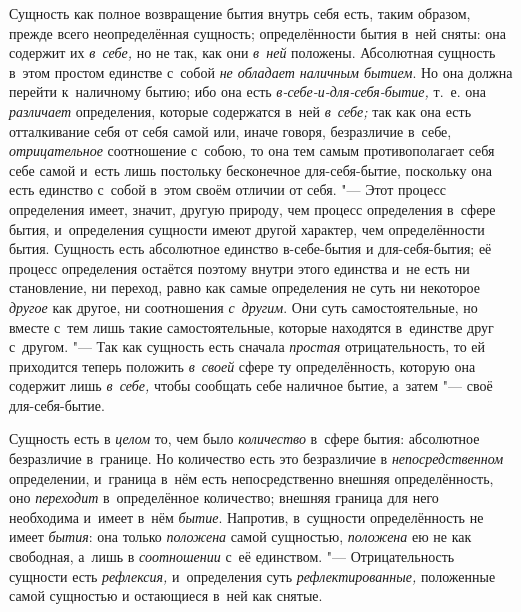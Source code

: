 Сущность как полное возвращение бытия внутрь себя есть, таким образом,
прежде всего неопределённая сущность; определённости бытия в~ней сняты: она
содержит их {\em в~себе,} но не так, как они
{\em в~ней} положены. Абсолютная сущность в~этом
простом единстве с~собой {\em не обладает наличным
бытием}. Но она должна перейти к~наличному бытию; ибо она есть
{\em в-себе-и-для-себя-бытие,} т.~е. она
{\em различает} определения, которые содержатся в~ней
{\em в~себе;} так как она есть отталкивание себя от
себя самой или, иначе говоря, безразличие в~себе,
{\em отрицательное} соотношение с~собою, то она тем
самым противополагает себя себе самой и~есть лишь постольку бесконечное
для-себя-бытие, поскольку она есть единство с~собой в~этом своём отличии от
себя. "--- Этот процесс определения имеет, значит, другую природу, чем процесс
определения в~сфере бытия, и~определения сущности имеют другой характер,
чем определённости бытия. Сущность есть абсолютное единство в-себе-бытия и
для-себя-бытия; её процесс определения остаётся поэтому внутри этого
единства и~не есть ни становление, ни переход, равно как самые определения
не суть ни некоторое {\em другое} как другое, ни
соотношения {\em с~другим}. Они суть самостоятельные,
но вместе с~тем лишь такие самостоятельные, которые находятся в~единстве
друг с~другом. "--- Так как сущность есть сначала
{\em простая} отрицательность, то ей приходится теперь
положить {\em в~своей} сфере ту определённость, которую
она содержит лишь {\em в~себе,} чтобы сообщать себе
наличное бытие, а~затем "--- своё для-себя-бытие.

Сущность есть в {\em целом} то, чем было
{\em количество} в~сфере бытия: абсолютное безразличие
в~границе. Но количество есть это безразличие в
{\em непосредственном} определении, и~граница в~нём
есть непосредственно внешняя определённость, оно
{\em переходит} в~определённое количество; внешняя
граница для него необходима и~имеет в~нём {\em бытие}.
Напротив, в~сущности определённость не имеет
{\em бытия}: она только
{\em положена} самой сущностью,
{\em положена} ею не как свободная, а~лишь в
{\em соотношении} с~её единством. "--- Отрицательность
сущности есть {\em рефлексия,} и~определения суть
{\em рефлектированные,} положенные самой сущностью и
остающиеся в~ней как снятые.

